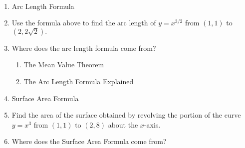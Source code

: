 \documentclass[11pt,fleqn]{article}
\begin{document}
\renewcommand{\headrulewidth}{0pt}
\newcommand{\blank}[1]{\rule{#1}{0.75pt}}
\newcommand{\bc}{\begin{center}}
\newcommand{\ec}{\end{center}}
\renewcommand{\d}{\displaystyle}

\vspace*{-0.7in}

\begin{center}
  \large
  \\
 
\end{center}

\begin{enumerate}
\item Arc Length Formula

\vspace{1in}

\item Use the formula above to find the arc length of $y=x^{3/2}$ from $(1,1)$ to $(2,2\sqrt{2}).$
\vspace{1.5in}

\item Where does the arc length formula come from?
	\begin{enumerate}
	\item The Mean Value Theorem
	\vspace{1in}
	\item The Arc Length Formula Explained
	\end{enumerate}
\newpage

\item Surface Area Formula

\vspace{2in}

\item Find the area of the surface obtained by revolving the portion of the curve $y=x^3$ from $(1,1)$ to $(2,8)$ about the $x$-axis.

\vspace{2in}

\item Where does the Surface Area Formula come from?

\end{enumerate}
\end{document}
